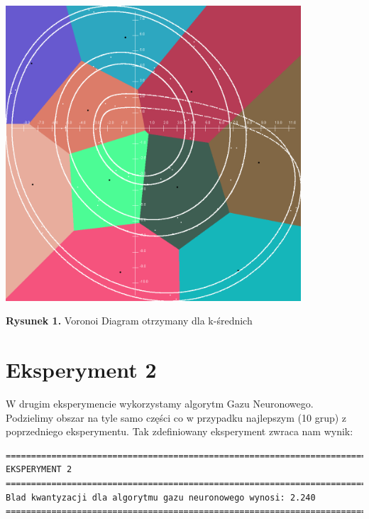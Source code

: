 \documentclass{classrep}
\begin{document}
\begin{center}
	\includegraphics[height=11cm]{kSrednich.png}
	
	
	\textbf{Rysunek 1.} Voronoi Diagram otrzymany dla k-średnich
\end{center}


\section{Eksperyment 2}
W drugim eksperymencie wykorzystamy algorytm Gazu Neuronowego. Podzielimy obszar na tyle samo części co w przypadku najlepszym (10 grup) z poprzedniego eksperymentu. Tak zdefiniowany eksperyment zwraca nam wynik:

\scriptsize
\begin{verbatim}
=====================================================================================================
EKSPERYMENT 2
=====================================================================================================
Blad kwantyzacji dla algorytmu gazu neuronowego wynosi: 2.240
=====================================================================================================
\end{verbatim}
\normalsize
\end{document}
